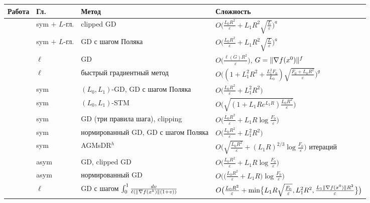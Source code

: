 \begin{center}
\footnotesize
{}
\label{tab:lit-convex}
\begin{tabularx}{\linewidth}{@{}P{.2\linewidth}lP{.2\linewidth}Y@{}}
\toprule
Работа & Гл. & Метод & Сложность\\
\midrule
\citet{koloskova2023revisiting} & sym $+$ $L$-гл. & clipped GD & $O\bigl(\frac{L_0R^2}{\varepsilon}+L_1R^2\sqrt{\frac L\varepsilon}\bigr)^{a}$\\
\citet{takezawa2024polyak} & sym $+$ $L$-гл. & GD с шагом Поляка & $O\bigl(\frac{L_0R^2}{\varepsilon}+L_1R^2\sqrt{\frac L\varepsilon}\bigr)^{a}$\\
\citet{li2023generalized} & $\ell$ & GD & $O\bigl(\frac{\ell(G)R^2}{\varepsilon}\bigr)$, $G=\|\nabla f(x^0)\|^{f}$\\
\citet{li2023generalized} & $\ell$ & быстрый градиентный метод & $O\bigl((1+L_1^2R^2+\frac{L_1^2F_0}{L_0})\sqrt{\frac{F_0+L_0R^2}\varepsilon}\bigr)^{g}$\\
\citet{gorbunov2024methods} & sym & $(L_0,L_1)$-GD, GD с шагом Поляка & $O\bigl(\frac{L_0R^2}{\varepsilon}+L_1^2R^2\bigr)$\\
\citet{gorbunov2024methods} & sym & $(L_0,L_1)$-STM & $O\bigl(\sqrt{(1+L_1Re^{L_1R})\frac{L_0R^2}{\varepsilon}}\bigr)$\\
\citet{vankov2025optimizing} & sym & GD (три правила шага), clipping & $O\bigl(\frac{L_0R^2}{\varepsilon}+L_1R\log\frac{F_0}{\varepsilon}\bigr)$\\
\citet{vankov2025optimizing} & sym & нормированный GD, GD с шагом Поляка & $O\bigl(\frac{L_0R^2}{\varepsilon}+L_1^2R^2\bigr)$\\
\citet{vankov2025optimizing} & sym & AGMsDR$^{h}$ & $O\bigl(\sqrt{\frac{L_0R^2}{\varepsilon}}+(L_1R)^{2/3}\log\frac{F_0}{\varepsilon}\bigr)$ итераций\\
\citet{lobanov2025linear} & asym & GD, clipped GD & $O\bigl(\frac{L_0R^2}{\varepsilon}+L_1R\log\frac{F_0}{\varepsilon}\bigr)$\\
\citet{lobanov2025linear} & asym & нормированный GD & $O\bigl(\bigl(\frac{L_0R^2}{\varepsilon}+L_1R\bigr)\log\frac{F_0}{\varepsilon}\bigr)$\\
\citet{tyurin2025unified} & $\ell$ & GD с шагом $\int_0^1\frac{dv}{\ell(\|\nabla f(x^k)\|(1+v))}$ & $O\bigl(\frac{L_0R^2}{\varepsilon}+\min\bigl\{L_1R\sqrt{\frac{F_0}\varepsilon},L_1^2R^2,\frac{L_1\|\nabla f(x^0)\|R^2}{\varepsilon}\bigr\}\bigr)$\\

\end{tabularx}
\end{center}
